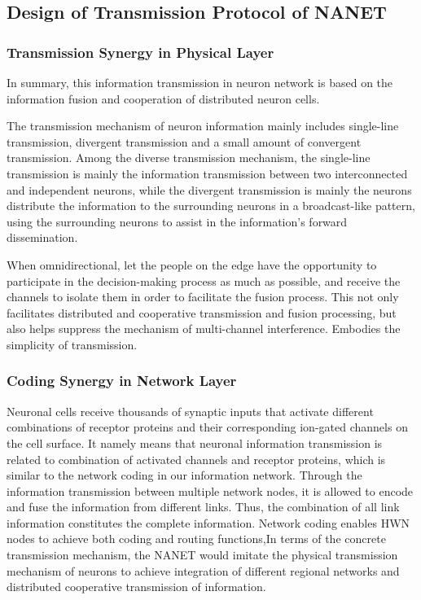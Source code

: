 \documentclass[journal,comsoc]{IEEEtran}
\begin{document}
		\subsection{Design of Transmission Protocol of NANET}
			\subsubsection{Transmission Synergy in Physical Layer}
				In summary, this information transmission in neuron network is based on the information fusion and cooperation of distributed neuron cells.
				
				The transmission mechanism of neuron information mainly includes single-line transmission, divergent transmission and a small amount of convergent transmission.
				Among the diverse transmission mechanism, the single-line transmission is mainly the information transmission between two interconnected and independent neurons, while the divergent transmission is mainly the neurons distribute the information to the surrounding neurons in a broadcast-like pattern, using the surrounding neurons to assist in the information's forward dissemination.
				
					When omnidirectional, let the people on the edge have the opportunity to participate in the decision-making process as much as possible, and receive the channels to isolate them in order to facilitate the fusion process.
				This not only facilitates distributed and cooperative transmission and fusion processing, but also helps suppress the mechanism of multi-channel interference.
				Embodies the simplicity of transmission.
			\subsubsection{Coding Synergy in Network Layer}
				Neuronal cells receive thousands of synaptic inputs that activate different combinations of receptor proteins and their corresponding ion-gated channels on the cell surface.
				It namely means that neuronal information transmission is related to combination of activated channels and receptor proteins, which is similar to the network coding in our information network. 
				Through the information transmission between multiple network nodes, it is allowed to encode and fuse the information from different links. 
				Thus, the combination of all link information constitutes the complete information.
				Network coding enables HWN nodes to achieve both coding and routing functions,In terms of the concrete transmission mechanism, the NANET would imitate the physical transmission mechanism of neurons 
				to achieve integration of different regional networks and distributed cooperative transmission of information.
				
\end{document}
